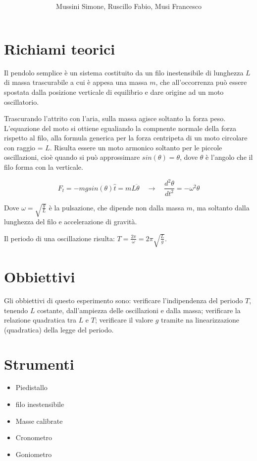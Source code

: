 \documentclass[12pt, a4paper]{article}
\title{\textbf{\scalebox{1.4}{\text{{\Huge Pendolo}}}}}
\date{}
\author{\begin{small}Mussini Simone, Ruscillo Fabio, Musi Francesco\end{small}}
\begin{document}
\maketitle



\section{Richiami teorici}
Il pendolo semplice è un sistema costituito da un filo inestensibile di lunghezza $L$ di massa trascurabile a cui è appesa una massa $m$, che all'occorrenza può essere spostata dalla posizione verticale di equilibrio e dare origine ad un moto oscillatorio. 

Trascurando l'attrito con l'aria, sulla massa agisce soltanto la forza peso. 
L'equazione del moto si ottiene egualiando la compnente normale della forza rispetto al filo, alla formula generica per la forza centripeta di un moto circolare con raggio = $L$.
Risulta essere un moto armonico soltanto per le piccole oscillazioni, cioè quando si può approssimare $sin(\theta) = \theta$, dove $\theta$ è l'angolo che il filo forma con la verticale. 

\begin{equation}
        F_t = -mg sin(\theta)\hat{t} = mL\ddot{\theta}   \quad \xrightarrow{} \quad   \frac{d^2\theta}{dt^2} = -\omega^2\theta 
\end{equation}

Dove $\omega = \sqrt{\frac{g}{L}}$ è la pulsazione, che dipende non dalla massa $m$, ma soltanto dalla lunghezza del filo e accelerazione di gravità. 

Il periodo di una oscillazione risulta: $T = \frac{2\pi}{\omega} = 2\pi\sqrt{\frac{L}{g}}$.





\section{Obbiettivi}
Gli obbiettivi di questo esperimento sono: 
verificare l'indipendenza del periodo $T$, tenendo $L$ costante, dall'ampiezza delle oscillazioni e dalla massa;
verificare la relazione quadratica tra $L$ e $T$; 
verificare il valore $g$ tramite na linearizzazione (quadratica) della legge del periodo.


\section{Strumenti}
    \begin{itemize}
        \item Piedistallo 
        \item filo inestensibile
        \item Masse calibrate
        \item Cronometro 
        \item Goniometro 
    \end{itemize}
\end{document}
